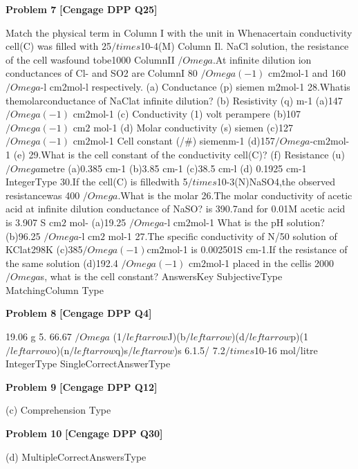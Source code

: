 \begin{problembox}
\textbf{Problem 7} \hfill \textbf{[Cengage DPP Q25]}
\label{q:ext-cng_dpp_all_questions-7}

Match the physical term in Column I with the unit in
Whenacertain conductivity cell(C) was filled with 25$/times$10-4(M)
Column Il.
NaCl solution, the resistance of the cell wasfound tobe1000
ColumnII
$/Omega$.At infinite dilution ion conductances of Cl- and SO2 are
ColumnI
80 $/Omega(-1)$ cm2mol-1 and 160 $/Omega$-l cm2mol-l respectively.
(a)
Conductance
(p)
siemen m$2$mol-1
28.Whatis themolarconductance of NaClat infinite dilution?
(b)
Resistivity
(q)
m-1
(a)147 $/Omega(-1)$ cm$2$mol-1
(c)
Conductivity
(1)
volt perampere
(b)107 $/Omega(-1)$ cm$2$ mol-1
(d)
Molar conductivity
(s)
siemen
(c)127 $/Omega(-1)$ cm$2$mol-1
Cell constant
(/\#)
siemenm-1
(d)157$/Omega$-cm$2$mol-1
(e)
29.What is the cell constant of the conductivity cell(C)?
(f)
Resistance
(u)
$/Omega$metre
(a)0.385 cm-1
(b)3.85 cm-1
(c)38.5 cm-l
(d) 0.1925 cm-1
IntegerType
30.If the cell(C) is filledwith 5$/times$10-3(N)NaSO4,the
observed resistancewas 400 $/Omega$.What is the molar
26.The molar conductivity of acetic acid at infinite dilution
conductance of NaSO?
is 390.7and for 0.01M acetic acid is 3.907 S cm$2$ mol-
(a)19.25 $/Omega$-l cm$2$mol-1
What is the pH solution?
(b)96.25 $/Omega$-l cm$2$ mol-1
27.The specific conductivity of N/50 solution of KClat298K
(c)385$/Omega(-1)$cm$2$mol-1
is 0.002501S cm-1.If the resistance of the same solution
(d)192.4 $/Omega(-1)$ cm$2$mol-1
placed in the cellis 2000 $/Omega$s, what is the cell constant?
AnswersKey
SubjectiveType
MatchingColumn Type
\end{problembox}

\begin{problembox}
\textbf{Problem 8} \hfill \textbf{[Cengage DPP Q4]}
\label{q:ext-cng_dpp_all_questions-8}

19.06 g 5. 66.67 $/Omega$
(1$/leftarrow$J)(b$/leftarrow$)(d$/leftarrow$p)(1$/leftarrow$o)(n$/leftarrow$q)s$/leftarrow$)s
6.1.5/%
7.2$/times$10-16 mol/litre
IntegerType
SingleCorrectAnswerType
\end{problembox}

\begin{problembox}
\textbf{Problem 9} \hfill \textbf{[Cengage DPP Q12]}
\label{q:ext-cng_dpp_all_questions-9}

(c)
Comprehension Type
\end{problembox}

\begin{problembox}
\textbf{Problem 10} \hfill \textbf{[Cengage DPP Q30]}
\label{q:ext-cng_dpp_all_questions-10}

(d)
MultipleCorrectAnswersType
\end{problembox}

